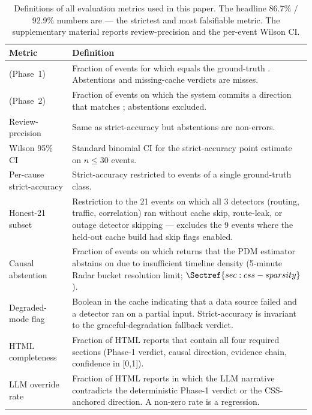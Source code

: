 \begin{table}[t]
\centering
\setlength{\tabcolsep}{4pt}
\renewcommand{\arraystretch}{1.05}
\small
\begin{tabular}{p{}p{}}
\hline
\textbf{Metric} & \textbf{Definition} \\ \hline
\strict{} (Phase~1) & Fraction of events for which
 equals the ground-truth .
Abstentions and missing-cache verdicts are misses. \\
\strict{} (Phase~2) & Fraction of events on which
the system commits a direction that matches
; abstentions excluded. \\
Review-precision & Same as strict-accuracy but abstentions
are non-errors. \\
Wilson 95\% CI & Standard binomial CI for the
strict-accuracy point estimate on $n \leq 30$ events. \\
Per-cause strict-accuracy & Strict-accuracy restricted to
events of a single ground-truth class. \\
Honest-21 subset & Restriction to the 21 events on which
all 3 detectors (routing, traffic, correlation) ran
without cache skip, route-leak, or outage detector
skipping --- excludes the 9 events where the held-out cache
build had skip flags enabled. \\
Causal abstention & Fraction of events on which
\css{} returns that the PDM estimator abstains on due to
insufficient timeline density (5-minute Radar bucket
resolution limit; $\Sectref{sec:css-sparsity}$). \\
Degraded-mode flag & Boolean in the cache indicating
that a data source failed and a detector ran on a
partial input. Strict-accuracy is invariant to the
graceful-degradation fallback verdict. \\
HTML completeness & Fraction of HTML reports that
contain all four required sections (Phase-1
verdict, causal direction, evidence chain, confidence in [0,1]). \\
LLM override rate & Fraction of HTML reports in which
the LLM narrative contradicts the deterministic
Phase-1 verdict or the CSS-anchored direction.
A non-zero rate is a regression. \\
\hline
\end{tabular}
\caption{Definitions of all evaluation metrics used in
this paper. The headline 86.7\% / 92.9\% numbers are
\strict{} --- the strictest and most falsifiable
metric. The supplementary material reports
review-precision and the per-event Wilson CI.}
\label{tab:metrics}
\end{table}

